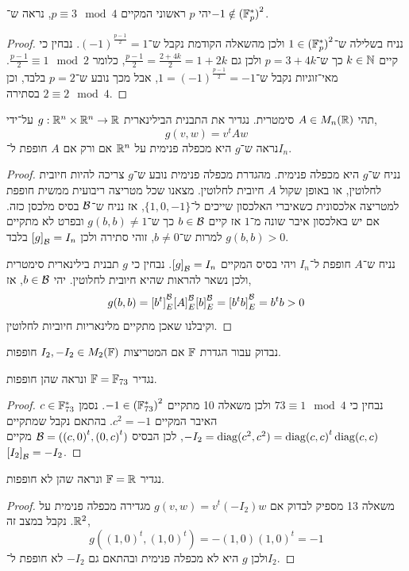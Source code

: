 \question{}
יהי $p$ ראשוני המקיים $p \equiv 3 \mod 4$, נראה ש־$-1 \notin {(\mathbb{F}_p^*)}^2$.
\begin{proof}
	נניח בשלילה ש־$1 \in {(\mathbb{F}_p^*)}^2$ ולכן מהשאלה הקודמת נקבל ש־${(-1)}^{\frac{p - 1}{2}} = 1$.
	נבחין כי קיים $k \in \mathbb{N}$ כך ש־$p = 3 + 4k$ ולכן גם $\frac{p - 1}{2} = \frac{2 + 4k}{2} = 1 + 2k$, כלומר $\frac{p - 1}{2} \equiv 1 \mod 2$.
	מאי־זוגיות נקבל ש־$1 = {(-1)}^{\frac{p - 1}{2}} = -1$, אבל מכך נובע ש־$p = 2$ בלבד, וכן $2 \equiv 2 \mod 4$ בסתירה.
\end{proof}

\question{}
תהי $A \in M_n(\mathbb{R})$ סימטרית.
נגדיר את התבנית הבילינארית $g : \mathbb{R}^n \times \mathbb{R}^n \to \mathbb{R}$ על־ידי,
\[
	g(v, w)
	= v^t A w
\]
נראה ש־$g$ היא מכפלה פנימית על $\mathbb{R}^n$ אם ורק אם $A$ חופפת ל־$I_n$.
\begin{proof}
	נניח ש־$g$ היא מכפלה פנימית.
	מהגדרת מכפלה פנימית נובע ש־$g$ צריכה להיות חיובית לחלוטין, או באופן שקול $A$ חיובית לחלוטין.
	מצאנו שכל מטריצה ריבועית ממשית חופפת למטריצה אלכסונית כשאיברי האלכסון שייכים ל־$\{1, 0, -1\}$, אז נניח ש־$\mathcal{B}$ בסיס מלכסן כזה.
	אם יש באלכסון איבר שונה מ־$1$ אז קיים $b \in \mathcal{B}$ כך ש־$g(b, b) \ne 1$ ובפרט לא מתקיים $g(b, b) > 0$ למרות ש־$b \ne 0$, זוהי סתירה ולכן ${[g]}_{\mathcal{B}} = I_n$ בלבד.

	נניח ש־$A$ חופפת ל־$I_n$ ויהי בסיס המקיים ${[g]}_{\mathcal{B}} = I_n$.
	נבחין כי $g$ תבנית בילינארית סימטרית ולכן נשאר להראות שהיא חיובית לחלוטין.
	יהי $b \in \mathcal{B}$, אז,
	\[
		g(b, b)
		= {[b^t]}_E^{\mathcal{B}} {[A]}_E^{\mathcal{B}} {[b]}_E^{\mathcal{B}} 
		= {[b^t b]}_E^{\mathcal{B}} 
		= b^t b
		> 0
	\]
	וקיבלנו שאכן מתקיים מלינאריות חיוביות לחלוטין.
\end{proof}

\question{}
נבדוק עבור הגדרת $\mathbb{F}$ אם המטריצות $I_2, -I_2 \in M_2(\mathbb{F})$ חופפות.

\subquestion{}
נגדיר $\mathbb{F} = \mathbb{F}_{73}$ ונראה שהן חופפות.
\begin{proof}
	נבחין כי $73 \equiv 1 \mod 4$ ולכן משאלה 10 מתקיים $-1 \in {(\mathbb{F}_{73}^*)}^2$.
	נסמן $c \in \mathbb{F}_{73}^*$ האיבר המקיים $c^2 = -1$.
	בהתאם נקבל שמתקיים $-I_2 = \operatorname{diag}(c^2, c^2) = {\operatorname{diag}(c, c)}^t \operatorname{diag}(c, c)$, לכן הבסיס $\mathcal{B} = ({(c, 0)}^t, {(0, c)}^t)$ מקיים ${[I_2]}_{\mathcal{B}} = -I_2$.
\end{proof}

\subquestion{}
נגדיר $\mathbb{F} = \mathbb{R}$ ונראה שהן לא חופפות.
\begin{proof}
	משאלה 13 מספיק לבדוק אם $g(v, w) = v^t (-I_2) w$ מגדירה מכפלה פנימית על $\mathbb{R}^2$.
	נקבל במצב זה,
	\[
		g({(1, 0)}^t, {(1, 0)}^t)
		= -(1, 0) {(1, 0)}^t
		= -1
	\]
	ולכן $g$ היא לא מכפלה פנימית ובהתאם גם $-I_2$ לא חופפת ל־$I_2$.
\end{proof}

